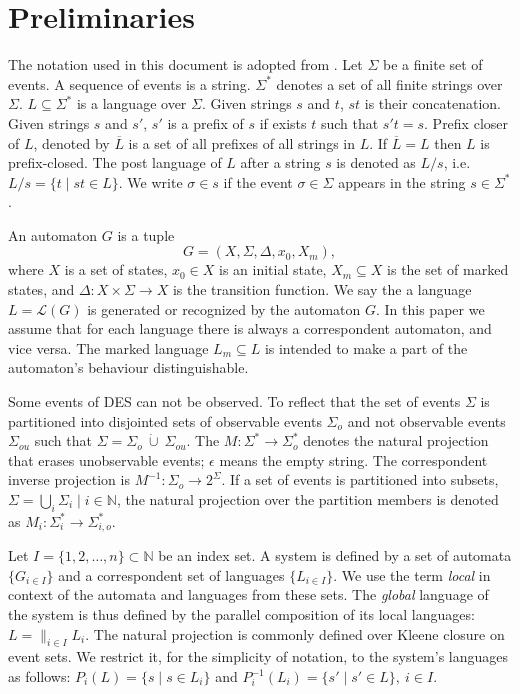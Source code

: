 \documentclass[a4paper, 10pt, conference]{ieeeconf}
\begin{document}
\section{Preliminaries}
\label{sec:Preliminaries}
The notation used in this document is adopted from
\cite{cassandras_introduction_2010}.
Let $\Sigma$ be a finite set of events. A sequence of events is a string.
$\Sigma^*$ denotes a set of all finite strings over $\Sigma$.
$L\subseteq\Sigma^*$ is a language over $\Sigma$. Given strings $s$ and $t$,
$st$ is their concatenation. Given strings $s$ and $s'$, $s'$ is a prefix of $s$
if exists $t$ such that $s't = s$. Prefix closer of $L$, denoted by
$\overline{L}$ is a set of all prefixes of all strings in $L$.
If $\overline{L} = L$ then $L$ is prefix-closed. The post language of $L$ after
a string $s$ is denoted as $L/s$, i.e. $L/s = \{t\mid st \in L\}$. We
write $\sigma \in s$ if the event $\sigma \in \Sigma$ appears in the string $s
\in \Sigma^*$.

An automaton $G$ is a tuple $$G=(X,\Sigma,\Delta,x_0, X_m),$$ where $X$ is a
set of states, $x_0 \in X$ is an initial state, $X_m \subseteq X$ is the set of
marked states, and $\Delta: X \times \Sigma \rightarrow X$ is the transition
function.
We say the a language $L = \mathcal{L}(G)$ is generated or recognized by the
automaton $G$. In this paper we assume that for each language there is always a
correspondent automaton, and vice versa. The marked language $L_m \subseteq L$
is intended to make a part of the automaton's behaviour distinguishable.

Some events of DES can not be observed. To reflect that the set of events
$\Sigma$ is partitioned into disjointed sets of observable events $\Sigma_o$ and
not observable events $\Sigma_{ou}$ such that $\Sigma = \Sigma_o~\dot{\cup}~
\Sigma_{ou}$.
The $M: \Sigma^* \rightarrow \Sigma_o^*$ denotes the natural projection that
erases unobservable events; $\epsilon$ means the empty string. The
correspondent inverse projection is $M^{-1}: \Sigma_o \rightarrow 2^\Sigma$. If
a set of events is partitioned into subsets, $\Sigma = \bigcup_i
\Sigma_{i} \mid i \in \mathbb{N}$, the natural projection over the partition
members is denoted as $M_i: \Sigma_i^* \rightarrow \Sigma_{i,o}^*$.

Let $I = \{1,2,\ldots,n\} \subset  \mathbb{N}$ be an index set. A system is
defined by a set of automata $\{G_{i \in I}\}$ and a correspondent set
of languages $\{L_{i \in I}\}$. We use the term \emph{local} in context
of the automata and languages from these sets. The \emph{global} language of the
system is thus defined by the parallel composition of its local languages: $L =
\parallel_{i \in I} L_i$.
The natural projection is commonly defined over Kleene closure on event sets.
We restrict it, for the simplicity of notation, to the system's languages as
follows: $P_i(L) = \{s\mid s\in L_{i}\}$ and $P_i^{-1}(L_{i}) = \{s' \mid s' \in
L\}, ~i \in I$.
\end{document}
